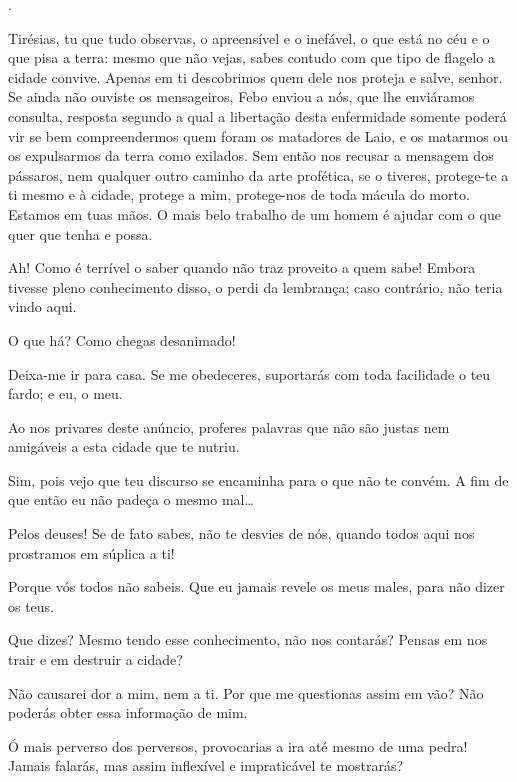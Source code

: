 .

   Tirésias, tu que tudo observas, o apreensível e o inefável, o que
está no céu e o que pisa a terra: mesmo que não vejas, sabes contudo com
que tipo de flagelo a cidade convive. Apenas em ti descobrimos quem dele
nos proteja e salve, senhor. Se ainda não ouviste os mensageiros, Febo
enviou a nós, que lhe enviáramos consulta, resposta segundo a qual a
libertação desta enfermidade somente poderá vir se bem compreendermos
quem foram os matadores de Laio, e os matarmos ou os expulsarmos
da terra como exilados. Sem então nos recusar a mensagem dos pássaros,
nem qualquer outro caminho da arte profética, se o tiveres, protege-te a
ti mesmo e à cidade, protege a mim, protege-nos de toda mácula do morto.
Estamos em tuas mãos. O mais belo trabalho de um homem é ajudar com o
que quer que tenha e possa.

   Ah! Como é terrível o saber quando não traz proveito a quem sabe! Embora
tivesse pleno conhecimento disso, o perdi da lembrança; caso contrário,
não teria vindo aqui.

   O que há? Como chegas desanimado!

   Deixa-me ir para casa. Se me obedeceres, suportarás com toda
facilidade o teu fardo; e eu, o meu.

   Ao nos privares deste anúncio, proferes palavras que não são justas nem
amigáveis a esta cidade que te nutriu.

   Sim, pois vejo que teu discurso se encaminha para o que não te convém. A
fim de que então eu não padeça o mesmo mal\ldots{}

   Pelos deuses! Se de fato sabes, não te desvies de nós, quando todos aqui
nos prostramos em súplica a ti!

   Porque vós todos não sabeis. Que eu jamais revele os meus males, para
não dizer os teus.

   Que dizes? Mesmo tendo esse conhecimento, não nos contarás? Pensas
em nos trair e em destruir a cidade?

   Não causarei dor a mim, nem a ti. Por que me questionas assim em vão?
Não poderás obter essa informação de mim.

   Ó mais perverso dos perversos, provocarias a ira até mesmo de uma pedra!
Jamais falarás, mas assim inflexível e impraticável te mostrarás?

